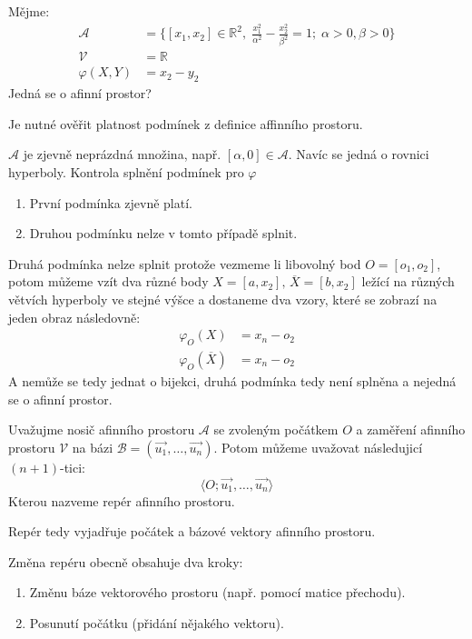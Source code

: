 \begin{example}
    Mějme:
    \begin{align*}
        \mathcal{A} &= \{[x_1, x_2] \in \mathbb{R}^2, \; \frac{x_1^2}{\alpha^2} -
        \frac{x_2^2}{\beta^2} = 1; \; \alpha > 0, \beta > 0 \}\\
        \mathcal{V} &= \mathbb{R}\\
        \varphi(X, Y) &= x_2 - y_2
    \end{align*}
    Jedná se o afinní prostor?


    Je nutné ověřit platnost podmínek z definice affinního prostoru.

    $\mathcal{A}$ je zjevně neprázdná množina, např. $[\alpha, 0] \in \mathcal{A}$.
    Navíc se jedná o rovnici hyperboly.
    Kontrola splnění podmínek pro $\varphi$
    \begin{enumerate}
        \item První podmínka zjevně platí.
        \item Druhou podmínku nelze v tomto případě splnit.
    \end{enumerate}
    Druhá podmínka nelze splnit protože vezmeme li libovolný bod $O = [o_1, o_2]$,
    potom můžeme vzít dva různé body $X = [a, x_2],\, \overline{X} = [b, x_2]$ ležící
    na různých větvích hyperboly ve stejné výšce a dostaneme dva vzory, které se zobrazí
    na jeden obraz následovně:
    \begin{align*}
        \varphi_O(X) &= x_n - o_2\\
        \varphi_O(\overline{X}) &= x_n - o_2
    \end{align*}
    A nemůže se tedy jednat o bijekci, druhá podmínka tedy není splněna a
    nejedná se o afinní prostor.
\end{example}

\begin{definition}
    Uvažujme nosič afinního prostoru $\mathcal{A}$ se zvoleným počátkem $O$ a zaměření
    afinního prostoru $\mathcal{V}$ na bázi $\mathcal{B} = (\vec{u_1},
    \ldots, \vec{u_n})$.
    Potom můžeme uvažovat následujicí $(n + 1)$-tici:
    $$\langle O; \vec{u_1}, \ldots, \vec{u_n} \rangle$$
    Kterou nazveme repér afinního prostoru.

    Repér tedy vyjadřuje počátek a bázové vektory afinního prostoru.

    Změna repéru obecně obsahuje dva kroky:
    \begin{enumerate}
        \item Změnu báze vektorového prostoru (např. pomocí matice přechodu).
        \item Posunutí počátku (přidání nějakého vektoru).
    \end{enumerate}
\end{definition}

